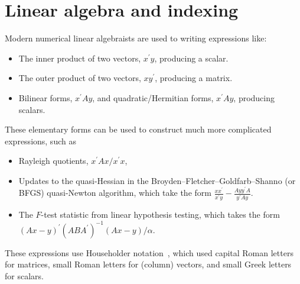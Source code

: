 \label{sec:householder}
\section{Linear algebra and indexing}

Modern numerical linear algebraists are used to writing expressions like:

\begin{itemize}

\item
The inner product of two vectors, $x^\prime y$, producing a scalar.

\item
The outer product of two vectors, $x y^\prime$, producing a matrix.

\item
Bilinear forms, $x^\prime A y$, and
quadratic/Hermitian forms, $x^\prime A y$, producing scalars.

\end{itemize}

These elementary forms can be used to construct much more complicated expressions, such as

\begin{itemize}

\item
Rayleigh quotients, $x^\prime A x / x^\prime x$,

\item
Updates to the quasi-Hessian in the Broyden--Fletcher--Goldfarb--Shanno (or BFGS) quasi-Newton algorithm, which take the form $\frac{x x^\prime}{x^\prime y} - \frac{A y y^\prime A}{y^\prime A y}$.

\item
The $F$-test statistic from linear hypothesis testing, which takes the form  $(Ax-y)^\prime (ABA^\prime)^{-1} (Ax-y)/\alpha$.

\end{itemize}

These expressions use Householder notation~\cite{Householder1953,Householder1955}, which used capital Roman letters for matrices, small Roman letters for (column) vectors, and small Greek letters for scalars.

